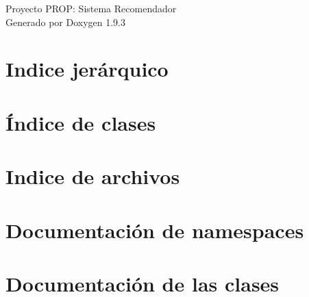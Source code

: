 \documentclass[twoside]{book}
\newcommand{\+}{\discretionary{\mbox{\scriptsize$\hookleftarrow$}}{}{}}
\newcommand{\clearemptydoublepage}{%
    \newpage{\pagestyle{empty}\cleardoublepage}%
  }
\begin{document}
  \raggedbottom
    \hypersetup{pageanchor=false,
                bookmarksnumbered=true,
                pdfencoding=unicode
               }
  \begin{titlepage}
  \vspace*{7cm}
  \begin{center}%
  {\Large Proyecto PROP\+: Sistema Recomendador}\\
  \vspace*{1cm}
  {\large Generado por Doxygen 1.9.3}\\
  \end{center}
  \end{titlepage}
  \clearemptydoublepage
  \tableofcontents
  \clearemptydoublepage
  \hypersetup{pageanchor=true}
\chapter{Indice jerárquico}

\chapter{Índice de clases}

\chapter{Indice de archivos}

\chapter{Documentación de namespaces}


\chapter{Documentación de las clases}





















\end{document}
